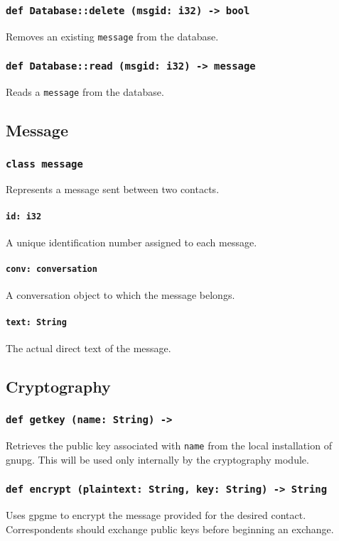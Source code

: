 \documentclass[]{article}
\begin{document}
\subsubsection{\texttt{def Database::delete (msgid: i32) -> bool}}
Removes an existing \verb!message! from the database.
\subsubsection{\texttt{def Database::read (msgid: i32) -> message}}
Reads a \verb!message! from the database.

\subsection{Message}
\subsubsection{\texttt{class message}}
Represents a message sent between two contacts.
\paragraph{\texttt{id: i32}}
A unique identification number assigned to each message.
\paragraph{\texttt{conv: conversation}}
A conversation object to which the message belongs.
\paragraph{\texttt{text: String}}
The actual direct text of the message.

\subsection{Cryptography}
\subsubsection{\texttt{def getkey (name: String) -> }}
Retrieves the public key associated with \verb|name| from the local installation of gnupg. This will be used only internally by the cryptography module.
\subsubsection{\texttt{def encrypt (plaintext: String, key: String) -> String}}
Uses gpgme to encrypt the message provided for the desired contact. Correspondents should exchange public keys before beginning an exchange.
\end{document}
